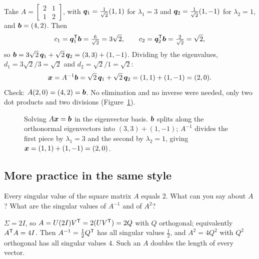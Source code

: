 \begin{example}\label{ex:u38-q3num}
Take $A=\begin{bmatrix}2&1\\1&2\end{bmatrix}$, with $\boldsymbol{q}_1=\tfrac{1}{\sqrt2}(1,1)$ for $\lambda_1=3$ and $\boldsymbol{q}_2=\tfrac{1}{\sqrt2}(1,-1)$ for $\lambda_2=1$, and $\boldsymbol{b}=(4,2)$. Then
\[
c_1=\boldsymbol{q}_1^{\mathsf{T}}\boldsymbol{b}=\tfrac{6}{\sqrt2}=3\sqrt2,\qquad c_2=\boldsymbol{q}_2^{\mathsf{T}}\boldsymbol{b}=\tfrac{2}{\sqrt2}=\sqrt2,
\]
so $\boldsymbol{b}=3\sqrt2\,\boldsymbol{q}_1+\sqrt2\,\boldsymbol{q}_2=(3,3)+(1,-1)$. Dividing by the eigenvalues, $d_1=3\sqrt2/3=\sqrt2$ and $d_2=\sqrt2/1=\sqrt2$:
\[
\boldsymbol{x}=A^{-1}\boldsymbol{b}=\sqrt2\,\boldsymbol{q}_1+\sqrt2\,\boldsymbol{q}_2=(1,1)+(1,-1)=(2,0).
\]
Check: $A(2,0)=(4,2)=\boldsymbol{b}$. No elimination and no inverse were needed, only two dot products and two divisions (Figure~\ref{fig:u38-expand}).
\end{example}

\begin{figure}[ht]\centering
{}
\caption{Solving $A\boldsymbol{x}=\boldsymbol{b}$ in the eigenvector basis. $\boldsymbol{b}$ splits along the orthonormal eigenvectors into $(3,3)+(1,-1)$; $A^{-1}$ divides the first piece by $\lambda_1=3$ and the second by $\lambda_2=1$, giving $\boldsymbol{x}=(1,1)+(1,-1)=(2,0)$.}\label{fig:u38-expand}
\end{figure}

\subsection{More practice in the same style}

\begin{exercise}\label{exr:u38-sigma2}
Every singular value of the square matrix $A$ equals $2$. What can you say about $A$? What are the singular values of $A^{-1}$ and of $A^{2}$?
\end{exercise}
\begin{solution}
$\Sigma=2I$, so $A=U(2I)V^{\mathsf{T}}=2(UV^{\mathsf{T}})=2Q$ with $Q$ orthogonal; equivalently $A^{\mathsf{T}} A=4I$. Then $A^{-1}=\tfrac12Q^{\mathsf{T}}$ has all singular values $\tfrac12$, and $A^{2}=4Q^{2}$ with $Q^{2}$ orthogonal has all singular values $4$. Such an $A$ doubles the length of every vector.
\end{solution}

